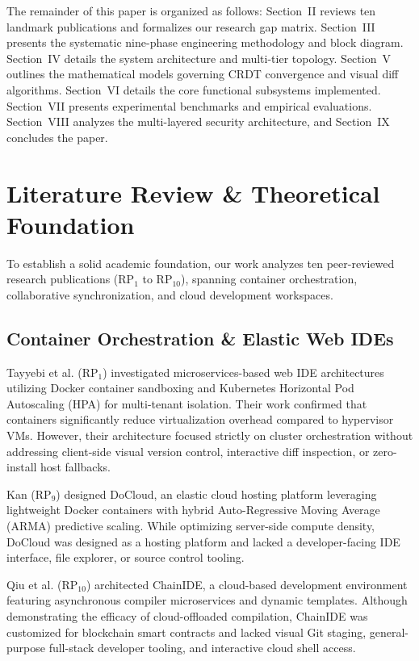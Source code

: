 \documentclass[conference]{IEEEtran}
\begin{document}
The remainder of this paper is organized as follows: Section~II reviews ten landmark publications and formalizes our research gap matrix. Section~III presents the systematic nine-phase engineering methodology and block diagram. Section~IV details the system architecture and multi-tier topology. Section~V outlines the mathematical models governing CRDT convergence and visual diff algorithms. Section~VI details the core functional subsystems implemented. Section~VII presents experimental benchmarks and empirical evaluations. Section~VIII analyzes the multi-layered security architecture, and Section~IX concludes the paper.

\section{Literature Review \& Theoretical Foundation}

To establish a solid academic foundation, our work analyzes ten peer-reviewed research publications ($\text{RP}_1$ to $\text{RP}_{10}$), spanning container orchestration, collaborative synchronization, and cloud development workspaces.

\subsection{Container Orchestration \& Elastic Web IDEs}
Tayyebi et al. ($\text{RP}_1$) \cite{rp1} investigated microservices-based web IDE architectures utilizing Docker container sandboxing and Kubernetes Horizontal Pod Autoscaling (HPA) for multi-tenant isolation. Their work confirmed that containers significantly reduce virtualization overhead compared to hypervisor VMs. However, their architecture focused strictly on cluster orchestration without addressing client-side visual version control, interactive diff inspection, or zero-install host fallbacks.

Kan ($\text{RP}_9$) \cite{rp9} designed DoCloud, an elastic cloud hosting platform leveraging lightweight Docker containers with hybrid Auto-Regressive Moving Average (ARMA) predictive scaling. While optimizing server-side compute density, DoCloud was designed as a hosting platform and lacked a developer-facing IDE interface, file explorer, or source control tooling.

Qiu et al. ($\text{RP}_{10}$) \cite{rp10} architected ChainIDE, a cloud-based development environment featuring asynchronous compiler microservices and dynamic templates. Although demonstrating the efficacy of cloud-offloaded compilation, ChainIDE was customized for blockchain smart contracts and lacked visual Git staging, general-purpose full-stack developer tooling, and interactive cloud shell access.
\end{document}

